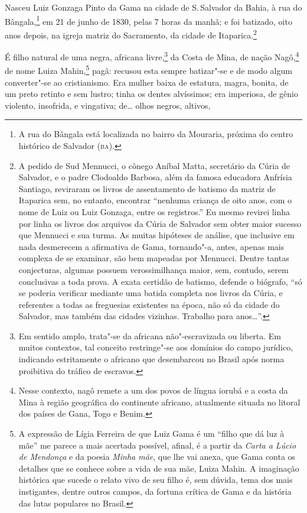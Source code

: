 Nasceu Luiz Gonzaga Pinto da Gama na cidade de S.\,Salvador da Bahia, à
rua do Bângala,\footnote{A rua do Bângala está localizada no bairro da
  Mouraria, próxima do centro histórico de Salvador (\textsc{ba}).} em 21 de
junho de 1830, pelas 7 horas da manhã; e foi batizado, oito anos depois,
na igreja matriz do Sacramento, da cidade de Itaparica.\footnote{A
  pedido de Sud Mennucci, o cônego Aníbal Matta, secretário da Cúria de
  Salvador, e o padre Clodoaldo Barbosa, além da famosa educadora
  Anfrísia Santiago, reviraram os livros de assentamento de batismo da
  matriz de Itaparica sem, no entanto, encontrar ``nenhuma criança de
  oito anos, com o nome de Luiz ou Luiz Gonzaga, entre os registros.'' Eu
  mesmo revirei linha por linha os livros dos arquivos da Cúria de
  Salvador sem obter maior sucesso que Mennucci e sua turma. As muitas
  hipóteses de análise, que inclusive em nada desmerecem a afirmativa de
  Gama, tornando"-a, antes, apenas mais complexa de se examinar, são bem
  mapeadas por Mennucci. Dentre tantas conjecturas, algumas possuem
  verossimilhança maior, sem, contudo, serem conclusivas a toda prova. A
  exata certidão de batismo, defende o biógrafo, ``só se poderia
  verificar mediante uma batida completa nos livros da Cúria, e
  referentes a todas as freguesias existentes na época, não só da cidade
  do Salvador, mas também das cidades vizinhas. Trabalho para anos\ldots{}''.}

É filho natural de uma negra, africana livre,\footnote{Em sentido
  amplo, trata"-se da africana não"-escravizada ou liberta. Em muitos
  contextos, tal conceito restringe"-se aos domínios do campo jurídico,
  indicando estritamente o africano que desembarcou no Brasil após norma
  proibitiva do tráfico de escravos.} da Costa de Mina, de nação
Nagô,\footnote{Nesse contexto, nagô remete a um dos povos de língua
  iorubá e a costa da Mina à região geográfica do continente africano,
  atualmente situada no litoral dos países de Gana, Togo e Benim.} de
nome Luiza Mahin,\footnote{A expressão de Lígia Ferreira de que Luiz
  Gama é um ``filho que dá luz à mãe'' me parece a mais acertada possível,
  afinal, é a partir da \emph{Carta a Lúcio de Mendonça} e da poesia
  \emph{Minha mãe}, que lhe vai anexa, que Gama conta os detalhes que
  se conhece sobre a vida de sua mãe, Luiza Mahin. A imaginação histórica
  que sucede o relato vivo de seu filho é, sem dúvida, tema dos mais
  instigantes, dentre outros campos, da fortuna crítica de Gama e da
  história das lutas populares no Brasil.} pagã: recusou esta sempre
batizar"-se e de modo algum converter"-se ao cristianismo. Era mulher
baixa de estatura, magra, bonita, de um preto retinto e sem lustro;
tinha os dentes alvíssimos; era imperiosa, de gênio violento, insofrida,
e vingativa; de\ldots{} olhos negros, altivos,

